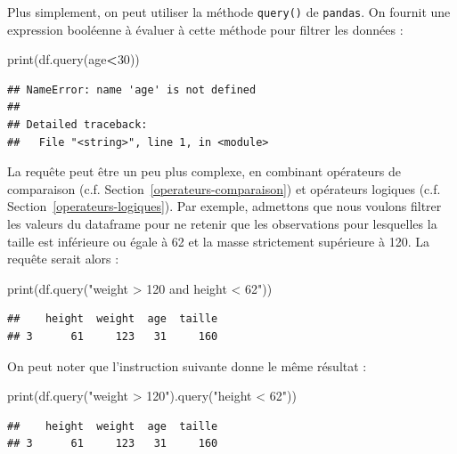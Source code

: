 \documentclass[12pt,]{book}
\newenvironment{Shaded}{\begin{snugshade}}{\end{snugshade}}
\newcommand{\DecValTok}[1]{\textcolor[rgb]{0.00,0.00,0.81}{#1}}
\newcommand{\StringTok}[1]{\textcolor[rgb]{0.31,0.60,0.02}{#1}}
\newcommand{\OperatorTok}[1]{\textcolor[rgb]{0.81,0.36,0.00}{\textbf{#1}}}
\newcommand{\BuiltInTok}[1]{#1}
\newcommand{\NormalTok}[1]{#1}
\numberwithin{equation}{section}
\numberwithin{countremarque}{section}
\begin{document}
Plus simplement, on peut utiliser la méthode \texttt{query()} de
\texttt{pandas}. On fournit une expression booléenne à évaluer à cette
méthode pour filtrer les données :

\begin{Shaded}
\begin{Highlighting}[]
\BuiltInTok{print}\NormalTok{(df.query(age}\OperatorTok{<}\DecValTok{30}\NormalTok{))}
\end{Highlighting}
\end{Shaded}

\begin{lstlisting}
## NameError: name 'age' is not defined
## 
## Detailed traceback: 
##   File "<string>", line 1, in <module>
\end{lstlisting}

La requête peut être un peu plus complexe, en combinant opérateurs de
comparaison (c.f. Section~\ref{operateurs-comparaison}) et opérateurs
logiques (c.f. Section~\ref{operateurs-logiques}). Par exemple,
admettons que nous voulons filtrer les valeurs du dataframe pour ne
retenir que les observations pour lesquelles la taille est inférieure ou
égale à 62 et la masse strictement supérieure à 120. La requête serait
alors :

\begin{Shaded}
\begin{Highlighting}[]
\BuiltInTok{print}\NormalTok{(df.query(}\StringTok{"weight > 120 and height < 62"}\NormalTok{))}
\end{Highlighting}
\end{Shaded}

\begin{lstlisting}
##    height  weight  age  taille
## 3      61     123   31     160
\end{lstlisting}

On peut noter que l'instruction suivante donne le même résultat :

\begin{Shaded}
\begin{Highlighting}[]
\BuiltInTok{print}\NormalTok{(df.query(}\StringTok{"weight > 120"}\NormalTok{).query(}\StringTok{"height < 62"}\NormalTok{))}
\end{Highlighting}
\end{Shaded}

\begin{lstlisting}
##    height  weight  age  taille
## 3      61     123   31     160
\end{lstlisting}
\end{document}
